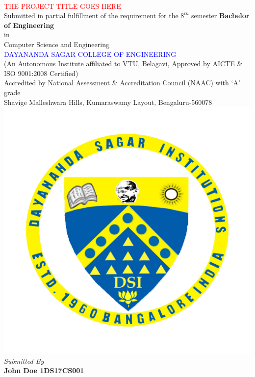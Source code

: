 \documentclass[ 12pt,a4paper,twocolumn,fleqn]{article}
\begin{document}
\chead{}
\onecolumn
\begin{center}
 \\
\smallskip
\textcolor{red}{\LARGE{THE PROJECT TITLE GOES HERE}} \\
\large{Submitted in partial fulfillment of the requirement for the $8^{th}$ semester}
\large{\textbf{Bachelor of Engineering}} \\
\large{in} \\
\large{Computer Science and Engineering} \\
\textcolor{blue}{\Large{DAYANANDA SAGAR COLLEGE OF ENGINEERING}} \\
\footnotesize{(An Autonomous Institute affiliated to VTU, Belagavi, Approved by AICTE \& ISO 9001:2008 Certified)} \\
\footnotesize{Accredited by National Assessment \& Accreditation Council (NAAC) with ‘A’ grade}  \\
\footnotesize{Shavige Malleshwara Hills, Kumaraswamy Layout, Bengaluru-560078} \\
\includegraphics[scale=0.4]{media/DSCE-min.png} \\
\textit{Submitted By} \\
\textbf{John Doe \space 1DS17CS001} \\

\end{center}
\end{document}

